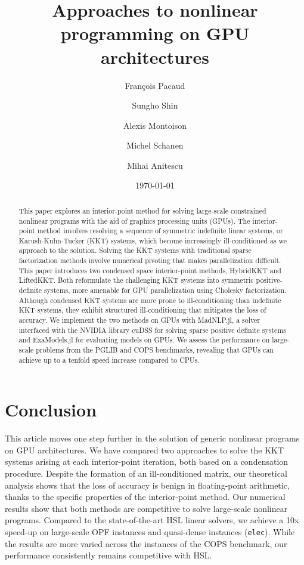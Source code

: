 \documentclass[smallextended]{svjour3}
\title{Approaches to nonlinear programming on GPU architectures}
\author{François Pacaud \and
Sungho Shin \and
Alexis Montoison \and
Michel Schanen \and
Mihai Anitescu
}
\date{\today}
\begin{document}
\maketitle

\begin{abstract}
  This paper explores an interior-point method for solving large-scale constrained nonlinear programs with the aid of graphics processing units (GPUs).
  The interior-point method involves resolving a sequence of symmetric indefinite linear systems, or Karush-Kuhn-Tucker (KKT) systems,
  which become increasingly ill-conditioned as we approach to the solution.
  Solving the KKT systems with traditional sparse factorization methods involve numerical pivoting that makes parallelization difficult.
  This paper introduces two condensed space interior-point methods, HybridKKT and LiftedKKT.
  Both reformulate the challenging KKT systems into symmetric positive-definite systems, more amenable for GPU parallelization using Cholesky factorization.
  Although condensed KKT systems are more prone to ill-conditioning than indefinite KKT systems, they exhibit structured ill-conditioning that mitigates the loss of accuracy.
  We implement the two methods on GPUs with MadNLP.jl, a solver interfaced with the NVIDIA library cuDSS for solving sparse positive definite systems and ExaModels.jl for evaluating models on GPUs.
  We assess the performance on large-scale problems from the PGLIB and COPS benchmarks, revealing that GPUs can achieve up to a tenfold speed increase compared to CPUs.
\end{abstract}









\section{Conclusion}
This article moves one step further in the solution of generic nonlinear
programs on GPU architectures. We have compared two approaches
to solve the KKT systems arising at each interior-point iteration, both
based on a condensation procedure.
Despite the formation of an ill-conditioned matrix, our theoretical analysis shows that the loss of accuracy is benign in floating-point arithmetic, thanks to the specific properties of the interior-point method.
Our numerical results show that both methods are competitive to solve large-scale
nonlinear programs.
Compared to the state-of-the-art HSL linear solvers, we achieve a 10x speed-up on large-scale OPF instances and quasi-dense instances (\texttt{elec}). While the results are more varied across the instances of the COPS benchmark, our performance consistently remains competitive with HSL.
\end{document}
